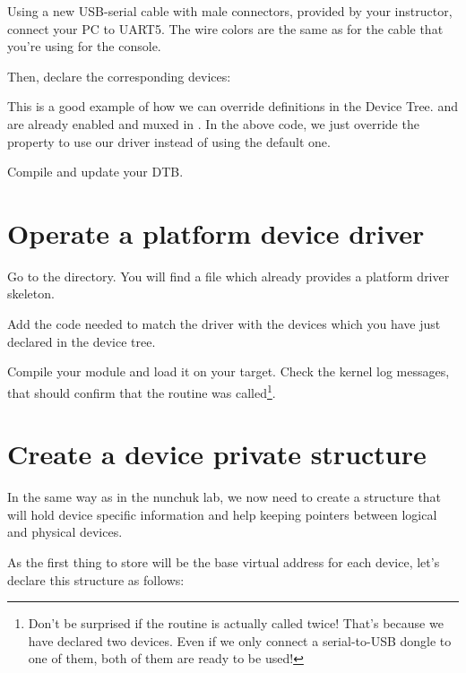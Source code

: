 {\scriptsize {}}

Using a new USB-serial cable with male connectors, provided by your
instructor, connect your PC to UART5. The wire colors are the same
as for the cable that you're using for the console.

Then, declare the corresponding devices:


This is a good example of how we can override definitions in the Device Tree.
 and  are already enabled and muxed in
. In the above code, we
just override the  property to use our driver instead of using
the default one.

Compile and update your DTB.

\section{Operate a platform device driver}

Go to the 
directory. You will find a  file which already provides a
platform driver skeleton.

Add the code needed to match the driver with the devices which you have
just declared in the device tree.

Compile your module and load it on your target. Check the kernel log
messages, that should confirm that the  routine was
called\footnote{Don't be surprised if the  routine is
actually called twice! That's because we have declared two devices.
Even if we only connect a serial-to-USB dongle to one of them, both
of them are ready to be used!}.

\section{Create a device private structure}

In the same way as in the nunchuk lab, we now need to create a
structure that will hold device specific information and help
keeping pointers between logical and physical devices.

As the first thing to store will be the base virtual address for
each device, let's declare this structure as follows:

